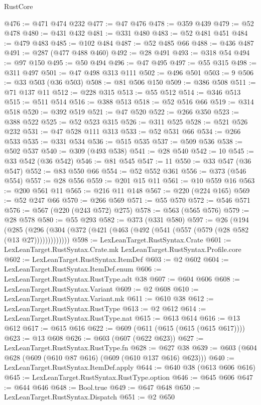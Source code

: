 \begin{lexlean}{RustCore}
\begin{coremodule}
@476 := @471 @474 @232
@477 := @47 @476
@478 := @359 @439
@479 := @52 @478
@480 := @431 @432
@481 := @331 @480
@483 := @52 @481 @451
@484 := @479 @483
@485 := @102 @484
@487 := @52 @485 @66
@488 := @436 @487
@491 := @287 (@477 @488 @460)
@492 := @28 @491
@493 := @318 @54
@494 := @97 @150
@495 := @50 @494
@496 := @47 @495
@497 := @55 @315
@498 := @311 @497
@501 := @47 @498 @313 @111
@502 := @496 @501
@503 := 9
@506 := @33 @503 (@36 @503)
@508 := @81 @506 @150
@509 := @386 @508
@511 := @71 @137 @11
@512 := @228 @315
@513 := @55 @512
@514 := @346 @513
@515 := @511 @514
@516 := @388 @513
@518 := @52 @516 @66
@519 := @314 @518
@520 := @392 @519
@521 := @47 @520
@522 := @266 @350
@523 := @388 @522
@525 := @52 @523 @315
@526 := @311 @525
@528 := @521 @526 @232
@531 := @47 @528 @111 @313
@533 := @52 @531 @66
@534 := @266 @533
@535 := @331 @534
@536 := @515 @535
@537 := @509 @536
@538 := @502 @537
@540 := @309 (@493 @538)
@541 := @28 @540
@542 := 10
@545 := @33 @542 (@36 @542)
@546 := @81 @545
@547 := 11
@550 := @33 @547 (@36 @547)
@552 := @83 @550 @66
@554 := @52 @552 @361
@556 := @373 (@546 @554)
@557 := @28 @556
@559 := @201 @15 @11
@561 := @10 @559 @16
@563 := @200 @561 @11
@565 := @216 @11 @148
@567 := @220 (@224 @165)
@569 := @52 @247 @66
@570 := @266 @569
@571 := @55 @570
@572 := @546 @571
@576 := @567 (@220 (@243 @572) @275)
@578 := @563 (@565 @576)
@579 := @28 @578
@580 := @55 @293
@582 := @373 (@331 @580)
@597 := @26
    (@194
      (@285 (@296 (@304 (@372 (@421 (@463 (@492 (@541 (@557 (@579 (@28 @582 (@13 @27)))))))))))))
@598 := LexLeanTarget.RustSyntax.Crate
@601 := LexLeanTarget.RustSyntax.Crate.mk LexLeanTarget.RustSyntax.Profile.core
@602 := LexLeanTarget.RustSyntax.ItemDef
@603 := @2 @602
@604 := LexLeanTarget.RustSyntax.ItemDef.enum
@606 := LexLeanTarget.RustSyntax.RustType.adt @38
@607 := @604 @606
@608 := LexLeanTarget.RustSyntax.Variant
@609 := @2 @608
@610 := LexLeanTarget.RustSyntax.Variant.mk
@611 := @610 @38
@612 := LexLeanTarget.RustSyntax.RustType
@613 := @2 @612
@614 := LexLeanTarget.RustSyntax.RustType.nat
@615 := @613 @614
@616 := @13 @612
@617 := @615 @616
@622 := @609 (@611 (@615 (@615 (@615 @617))))
@623 := @13 @608
@626 := @603 (@607 (@622 @623))
@627 := LexLeanTarget.RustSyntax.RustType.fn
@628 := @627 @38
@639 := @603 (@604 @628 (@609 (@610 @87 @616) (@609 (@610 @137 @616) @623)))
@640 := LexLeanTarget.RustSyntax.ItemDef.apply
@644 := @640 @38 (@613 @606 @616)
@645 := LexLeanTarget.RustSyntax.RustType.option
@646 := @645 @606
@647 := @644 @646
@648 := Bool.true
@649 := @647 @648
@650 := LexLeanTarget.RustSyntax.Dispatch
@651 := @2 @650

\end{coremodule}
\end{lexlean}

